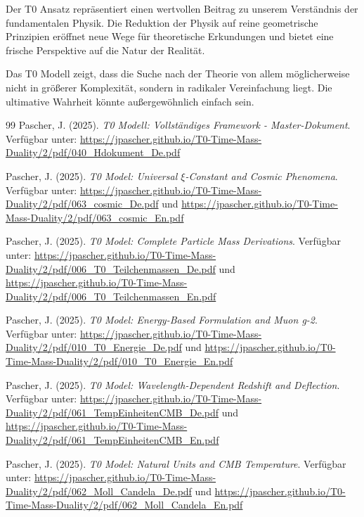 	Der T0 Ansatz repräsentiert einen wertvollen Beitrag zu unserem Verständnis der fundamentalen Physik. Die Reduktion der Physik auf reine geometrische Prinzipien eröffnet neue Wege für theoretische Erkundungen und bietet eine frische Perspektive auf die Natur der Realität.
	
	\begin{revolutionaer}
		Das T0 Modell zeigt, dass die Suche nach der Theorie von allem möglicherweise nicht in größerer Komplexität, sondern in radikaler Vereinfachung liegt. Die ultimative Wahrheit könnte außergewöhnlich einfach sein.
	\end{revolutionaer}
	
	\begin{thebibliography}{99}
		Pascher, J. (2025). \textit{T0 Modell: Vollständiges Framework - Master-Dokument}. Verfügbar unter: \url{https://jpascher.github.io/T0-Time-Mass-Duality/2/pdf/040_Hdokument_De.pdf}
		
		Pascher, J. (2025). \textit{T0 Model: Universal $\xi$-Constant and Cosmic Phenomena}. Verfügbar unter: \url{https://jpascher.github.io/T0-Time-Mass-Duality/2/pdf/063_cosmic_De.pdf} und \url{https://jpascher.github.io/T0-Time-Mass-Duality/2/pdf/063_cosmic_En.pdf}
		
		Pascher, J. (2025). \textit{T0 Model: Complete Particle Mass Derivations}. Verfügbar unter: \url{https://jpascher.github.io/T0-Time-Mass-Duality/2/pdf/006_T0_Teilchenmassen_De.pdf} und \url{https://jpascher.github.io/T0-Time-Mass-Duality/2/pdf/006_T0_Teilchenmassen_En.pdf}
		
		Pascher, J. (2025). \textit{T0 Model: Energy-Based Formulation and Muon g-2}. Verfügbar unter: \url{https://jpascher.github.io/T0-Time-Mass-Duality/2/pdf/010_T0_Energie_De.pdf} und \url{https://jpascher.github.io/T0-Time-Mass-Duality/2/pdf/010_T0_Energie_En.pdf}
		
		Pascher, J. (2025). \textit{T0 Model: Wavelength-Dependent Redshift and Deflection}. Verfügbar unter: \url{https://jpascher.github.io/T0-Time-Mass-Duality/2/pdf/061_TempEinheitenCMB_De.pdf} und \url{https://jpascher.github.io/T0-Time-Mass-Duality/2/pdf/061_TempEinheitenCMB_En.pdf}
		
		Pascher, J. (2025). \textit{T0 Model: Natural Units and CMB Temperature}. Verfügbar unter: \url{https://jpascher.github.io/T0-Time-Mass-Duality/2/pdf/062_Moll_Candela_De.pdf} und \url{https://jpascher.github.io/T0-Time-Mass-Duality/2/pdf/062_Moll_Candela_En.pdf}
		

\end{thebibliography}
